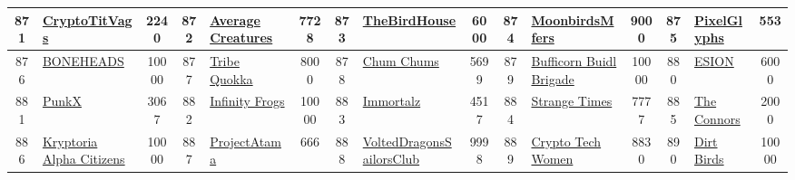 \begin{table*}[]
{\begin{tabular}{|c|l|c|c|l|c|c|l|c|c|l|c|c|l|c|}
        871   & \href{http://cryptotitvags.wtf}{CryptoTitVags}                                     & 2240              & 872   & \href{https://averagecreatures.io}{Average Creatures}                                             & 7728              & 873   & \href{https://thebirdhouse.app}{TheBirdHouse}                                     & 6000              & 874   & \href{https://opensea.io/collection/moonfers}{MoonbirdsMfers}                 & 9000              & 875   & \href{https://pixelglyphs.io}{PixelGlyphs}                                                & 553                                     \\ \hline
        876   & \href{https://opensea.io/collection/boneheadsorigins}{BONEHEADS}                   & 10000             & 877   & \href{https://www.tribequokka.com}{Tribe Quokka}                                                  & 8000              & 878   & \href{http://chumchums.io}{Chum Chums}                                            & 5699              & 879   & \href{https://bufficornbuidlbrigade.com/}{Bufficorn Buidl Brigade}            & 10000             & 880   & \href{https://esionnft.com/}{ESION}                                                       & 6000                                    \\ \hline
        881   & \href{https://punkxnft.com/}{PunkX}                                                & 3067              & 882   & \href{https://infinityfrogs.com/}{Infinity Frogs}                                                 & 10000             & 883   & \href{https://0ximmortalz.com}{Immortalz}                                         & 4517              & 884   & \href{https://opensea.io/collection/strange-times-}{Strange Times}            & 7777              & 885   & \href{https://www.theconnors.xyz/}{The Connors}                                           & 2000                                    \\ \hline
        886   & \href{https://kryptoria.io}{Kryptoria Alpha Citizens}                              & 10000             & 887   & \href{http://projectatama.io}{ProjectAtama}                                                       & 666               & 888   & \href{http://volteddragons.com}{VoltedDragonsSailorsClub}                         & 9998              & 889   & \href{https://linktr.ee/cryptotechwomennft}{Crypto Tech Women}                & 8830              & 890   & \href{http://dirtbirds.wtf}{Dirt Birds}                                                   & 10000                                   \\ \hline

\end{tabular}}
\end{table*}
